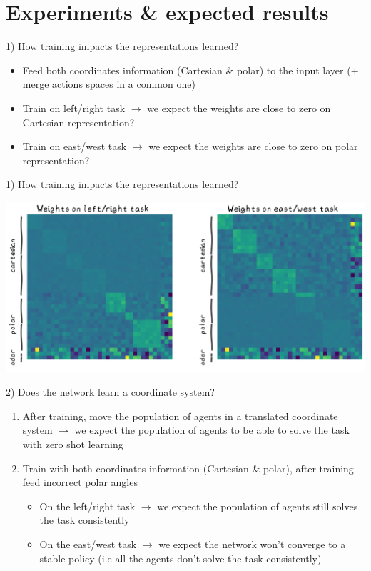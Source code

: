 \documentclass[bigger]{beamer}
\begin{document}
\section{Experiments \& expected results  }
\label{sec:orgc67c098}
\begin{frame}[<+->][label={sec:org41b93b0}]{1) How training impacts the representations learned?}
\begin{itemize}
\item Feed both coordinates information (Cartesian \& polar) to the input layer (+ merge actions spaces in a common one)
\item Train on left/right task \(\to\) we expect the weights are close to zero on Cartesian representation?
\item Train on east/west task \(\to\) we expect the weights are close to zero on polar representation?
\end{itemize}
\end{frame}
\begin{frame}[label={sec:org31a4945}]{1) How training impacts the representations learned?}
\begin{center}
\includegraphics[width=.9\linewidth]{img/exp1-weights-heatmap.png}
\end{center}
\end{frame}
\begin{frame}[<+->][label={sec:orgf6295e5}]{2) Does the network learn a coordinate system?}
\begin{enumerate}
\item After training, move the population of agents in a translated coordinate system
\(\to\) we expect the population of agents to be able to solve the task with zero shot learning
\item Train with both coordinates information (Cartesian \& polar), after training feed incorrect polar angles
\begin{itemize}
\item On the left/right task \(\to\) we expect the population of agents still solves the task consistently
\item On the east/west task \(\to\) we expect the network won't converge to a stable policy (i.e all the agents don't solve the task consistently)
\end{itemize}
\end{enumerate}
\end{frame}
\end{document}
